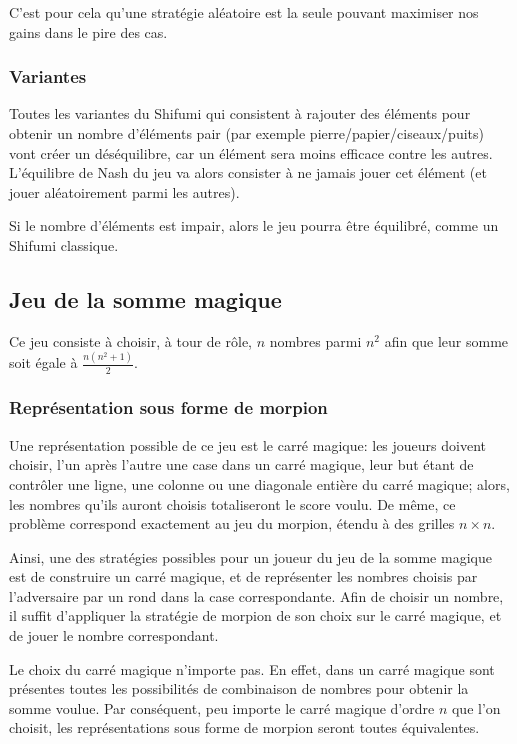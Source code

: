     C'est pour cela qu'une stratégie aléatoire est la seule pouvant maximiser
    nos gains dans le pire des cas.

  \subsubsection{Variantes}
    Toutes les variantes du Shifumi qui consistent à rajouter des éléments
    pour obtenir un nombre d'éléments pair (par exemple
    pierre/papier/ciseaux/puits) vont créer un déséquilibre, car un élément
    sera moins efficace contre les autres.
    L'équilibre de Nash du jeu va
    alors consister à ne jamais jouer cet élément (et jouer aléatoirement parmi
    les autres).

    Si le nombre d'éléments est impair, alors le jeu pourra être équilibré,
    comme un Shifumi classique.

\subsection{Jeu de la somme magique}
  Ce jeu consiste à choisir, à tour de rôle, $n$ nombres parmi $n^2$ afin que
  leur somme soit égale à $\frac{n(n^2+1)}{2}$.

  \subsubsection{Représentation sous forme de morpion}
Une représentation possible de ce jeu est le carré magique: les
joueurs doivent choisir, l'un après l'autre une case dans un carré
magique, leur but étant de contrôler une ligne, une colonne ou une
diagonale entière du carré magique; alors, les nombres qu'ils auront
choisis totaliseront le score voulu. De même, ce problème correspond exactement
au jeu du morpion, étendu à des grilles $n \times n$.

Ainsi, une des stratégies possibles pour un joueur du jeu de la somme
magique est de construire un carré magique, et de représenter les
nombres choisis par l'adversaire par un rond dans la case
correspondante. Afin de choisir un nombre, il suffit d'appliquer la
stratégie de morpion de son choix sur le carré magique, et de
jouer le nombre correspondant.

Le choix du carré magique n'importe pas. En effet, dans un carré
magique sont présentes toutes les possibilités de combinaison de
nombres pour obtenir la somme voulue. Par conséquent, peu importe le
carré magique d'ordre $n$ que l'on choisit, les représentations sous forme de
morpion seront toutes équivalentes.

